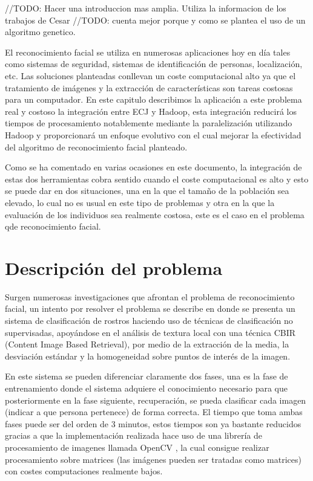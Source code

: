 \label{problema-facerecognition}
//TODO: Hacer una introduccion mas amplia. Utiliza la informacion de los trabajos de Cesar
//TODO: cuenta mejor porque y como se plantea el uso de un algoritmo genetico.

El reconocimiento facial se utiliza en numerosas aplicaciones hoy en día tales como sistemas de seguridad, sistemas de identificación de personas, localización, etc. Las soluciones planteadas conllevan un coste computacional alto ya que el tratamiento de imágenes y la extracción de características son tareas costosas para un computador. En este capitulo describimos la aplicación a este problema real y costoso la integración entre ECJ y Hadoop, esta integración reducir\'a los tiempos de procesamiento notablemente mediante la paralelizaci\'on utilizando Hadoop y proporcionar\'a un enfoque evolutivo con el cual mejorar la efectividad del algoritmo de reconocimiento facial planteado.

Como se ha comentado en varias ocasiones en este documento, la integración de estas dos herramientas cobra sentido cuando el coste computacional es alto y esto se puede dar en dos situaciones, una en la que el tama\~no de la población sea elevado, lo cual no es usual en este tipo de problemas y otra en la que la evaluación de los individuos sea realmente costosa, este es el caso en el problema qde reconocimiento facial.

\section{Descripci\'on del problema}

Surgen numerosas investigaciones que afrontan el problema de reconocimiento facial, un intento por resolver el problema se describe en \cite{paper-facerecognition} donde se presenta un sistema de clasificación de rostros haciendo uso de técnicas de clasificaci\'on no supervisadas, apoy\'andose en el an\'alisis de textura local con una t\'ecnica CBIR (Content Image Based Retrieval), por medio de la extracci\'on de la media, la desviaci\'on est\'andar y la homogeneidad sobre puntos de inter\'es de la imagen.

En este sistema se pueden diferenciar claramente dos fases, una es la fase de entrenamiento donde el sistema adquiere el conocimiento necesario para que posteriormente en la fase siguiente, recuperación, se pueda clasificar cada imagen (indicar a que persona pertenece) de forma correcta. El tiempo que toma ambas fases puede ser del orden de 3 minutos, estos tiempos son ya bastante reducidos gracias a que la implementaci\'on realizada hace uso de una librería de procesamiento de imagenes llamada OpenCV \cite{opencv}, la cual consigue realizar procesamiento sobre matrices (las imágenes pueden ser tratadas como matrices) con costes computaciones realmente bajos.

